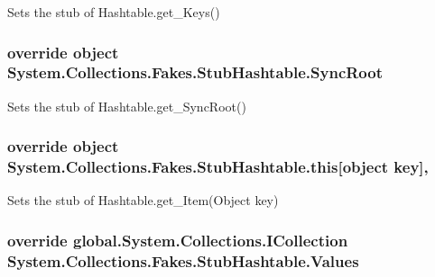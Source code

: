 Sets the stub of Hashtable.\-get\-\_\-\-Keys()

\hypertarget{class_system_1_1_collections_1_1_fakes_1_1_stub_hashtable_a62c05686ed587bb1c5b80ce171d8879a}{
\subsubsection[{Sync\-Root}]{\setlength{\rightskip}{0pt plus 5cm}override object System.\-Collections.\-Fakes.\-Stub\-Hashtable.\-Sync\-Root\hspace{0.3cm}{\ttfamily [get]}}}\label{class_system_1_1_collections_1_1_fakes_1_1_stub_hashtable_a62c05686ed587bb1c5b80ce171d8879a}


Sets the stub of Hashtable.\-get\-\_\-\-Sync\-Root()

\hypertarget{class_system_1_1_collections_1_1_fakes_1_1_stub_hashtable_a23868cd3e9018f5f297f28a714242d5b}{
\subsubsection[{this[object key]}]{\setlength{\rightskip}{0pt plus 5cm}override object System.\-Collections.\-Fakes.\-Stub\-Hashtable.\-this\mbox{[}object key\mbox{]}\hspace{0.3cm}{\ttfamily [get]}, {\ttfamily [set]}}}\label{class_system_1_1_collections_1_1_fakes_1_1_stub_hashtable_a23868cd3e9018f5f297f28a714242d5b}


Sets the stub of Hashtable.\-get\-\_\-\-Item(\-Object key)

\hypertarget{class_system_1_1_collections_1_1_fakes_1_1_stub_hashtable_ab427cc6184ece7fe53eefb041ddbfa75}{
\subsubsection[{Values}]{\setlength{\rightskip}{0pt plus 5cm}override global.\-System.\-Collections.\-I\-Collection System.\-Collections.\-Fakes.\-Stub\-Hashtable.\-Values\hspace{0.3cm}{\ttfamily [get]}}}\label{class_system_1_1_collections_1_1_fakes_1_1_stub_hashtable_ab427cc6184ece7fe53eefb041ddbfa75}


